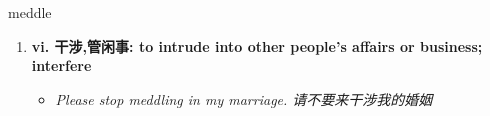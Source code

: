 
\begin{frame}
{\huge meddle}
\begin{center}
\begin{enumerate}\Large
  \item \textbf{vi. 干涉,管闲事: to intrude into other people's affairs or business; interfere}
  \begin{itemize}
    \item \em{\Large{Please stop meddling in my marriage. 请不要来干涉我的婚姻}}
  \end{itemize}
\end{enumerate}
\end{center}
\end{frame}
